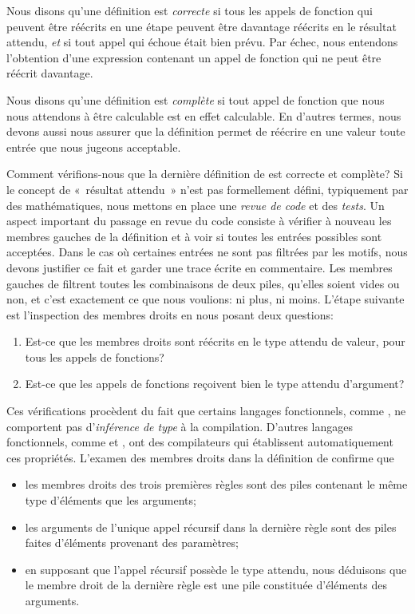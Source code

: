 Nous disons qu'une définition est \emph{correcte} si tous les appels
de fonction qui peuvent être réécrits en une étape peuvent être
davantage réécrits en le résultat attendu, \emph{et} si tout appel qui
échoue était bien prévu. Par échec, nous entendons l'obtention d'une
expression contenant un appel de fonction qui ne peut être réécrit
davantage.

Nous disons qu'une définition est \emph{complète} si tout appel de
fonction que nous nous attendons à être calculable est en effet
calculable. En d'autres termes, nous devons aussi nous assurer que la
définition permet de réécrire en une valeur toute entrée que nous
jugeons acceptable.

Comment vérifions-nous que la dernière définition de  est
correcte et complète? Si le concept de «~résultat attendu~» n'est pas
formellement défini, typiquement par des mathématiques, nous mettons
en place une \emph{revue de code} et des \emph{tests}. Un aspect
important du passage en revue du code consiste à vérifier à nouveau
les membres gauches de la définition et à voir si toutes les entrées
possibles sont acceptées. Dans le cas où certaines entrées ne sont pas
filtrées par les motifs, nous devons justifier ce fait et garder une
trace écrite en commentaire. Les membres gauches de 
filtrent toutes les combinaisons de deux piles, qu'elles soient vides
ou non, et c'est exactement ce que nous voulions: ni plus, ni
moins. L'étape suivante est l'inspection des membres droits en nous
posant deux questions:
\begin{enumerate}

  \item Est-ce que les membres droits sont réécrits
    en le type attendu de valeur, pour tous les appels de fonctions?

  \item Est-ce que les appels de fonctions reçoivent bien le type attendu
    d'argument?

\end{enumerate}
Ces vérifications procèdent du fait que certains langages
fonctionnels, comme \Erlang, ne comportent pas d'\emph{inférence de
type} à la compilation. D'autres langages fonctionnels, comme \OCaml
et \Haskell, ont des compilateurs qui établissent automatiquement ces
propriétés. L'examen des membres droits dans la définition de
 confirme que
\begin{itemize}

\item les membres droits des trois premières règles sont des piles
  contenant le même type d'éléments que les arguments;

\item les arguments de l'unique appel récursif dans la dernière règle
  sont des piles faites d'éléments provenant des paramètres;

\item en supposant que l'appel récursif possède le type attendu, nous
  déduisons que le membre droit de la dernière règle est une pile
  constituée d'éléments des arguments.

\end{itemize}
